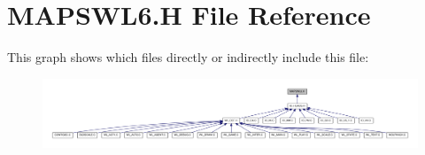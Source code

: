 \hypertarget{MAPSWL6_8H}{
\section{MAPSWL6.H File Reference}
\label{MAPSWL6_8H}
}
This graph shows which files directly or indirectly include this file:
\nopagebreak
\begin{figure}[H]
\begin{center}
\leavevmode
\includegraphics[width=400pt]{MAPSWL6_8H__dep__incl}
\end{center}
\end{figure}
